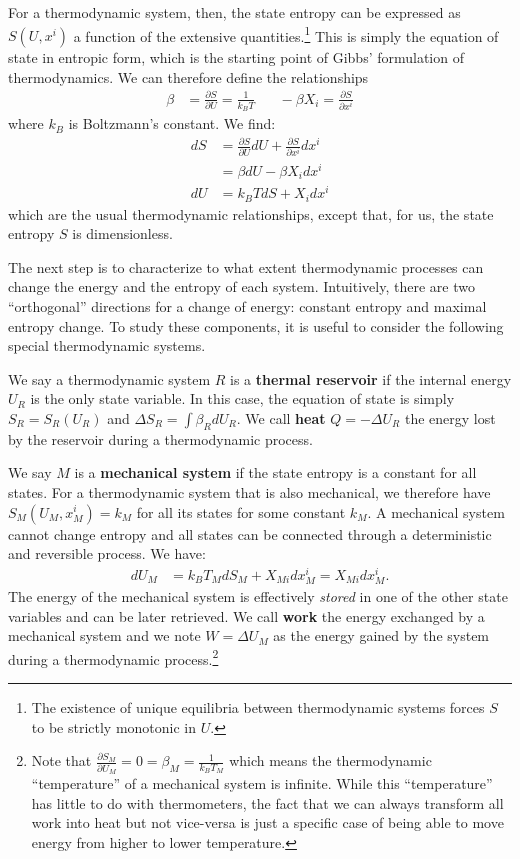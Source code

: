 \documentclass[letterpaper,twocolumn]{article}
\begin{document}
For a thermodynamic system, then, the state entropy can be expressed as $S(U, x^i)$ a function of the extensive quantities.\footnote{The existence of unique equilibria between thermodynamic systems forces $S$ to be strictly monotonic in $U$.} This is simply the equation of state in entropic form, which is the starting point of Gibbs' formulation of thermodynamics. %
We can therefore define the relationships
\begin{align}
\beta &= \frac{\partial S}{\partial U} = \frac{1}{k_B T} \;\;\;\;\;\; - \beta X_i = \frac{\partial S}{\partial x^i}
\end{align}
where $k_B$ is Boltzmann's constant. We find:
\begin{align}
dS &= \frac{\partial S}{\partial U} dU + \frac{\partial S}{\partial x^i} dx^i \\
&= \beta dU - \beta X_i dx^i \\
dU &= k_B T dS + X_i dx^i
\end{align}
which are the usual thermodynamic relationships, except that, for us, the state entropy $S$ is dimensionless.

The next step is to characterize to what extent thermodynamic processes can change the energy and the entropy of each system. Intuitively, there are two ``orthogonal'' directions for a change of energy: constant entropy and maximal entropy change. To study these components, it is useful to consider the following special thermodynamic systems.

We say a thermodynamic system $R$ is a \textbf{thermal reservoir} if the internal energy $U_R$ is the only state variable. In this case, the equation of state is simply $S_R = S_R(U_R)$ and $\Delta S_R = \int \beta_R dU_R$. We call \textbf{heat} $Q = - \Delta U_R$ the energy lost by the reservoir during a thermodynamic process.

We say $M$ is a \textbf{mechanical system} if the state entropy is a constant for all states. For a thermodynamic system that is also mechanical, we therefore have  $S_M(U_M, x^i_M) = k_M$ for all its states for some constant $k_M$. A mechanical system cannot change entropy and all states can be connected through a deterministic and reversible process. We have:
\begin{equation}
\begin{aligned}
dU_M &= k_B T_M dS_M + X_{Mi} dx^i_M = X_{Mi} dx^i_M.
\end{aligned}
\end{equation}
The energy of the mechanical system is effectively \emph{stored} in one of the other state variables and can be later retrieved. We call \textbf{work} the energy exchanged by a mechanical system and we note $W=\Delta U_M$ as the energy gained by the system during a thermodynamic process.\footnote{Note that $\frac{\partial S_M}{\partial U_M} = 0 = \beta_M = \frac{1}{k_B T_M}$ which means the thermodynamic ``temperature'' of a mechanical system is infinite. While this ``temperature'' has little to do with thermometers, the fact that we can always transform all work into heat but not vice-versa is just a specific case of being able to move energy from higher to lower temperature.}
\end{document}
